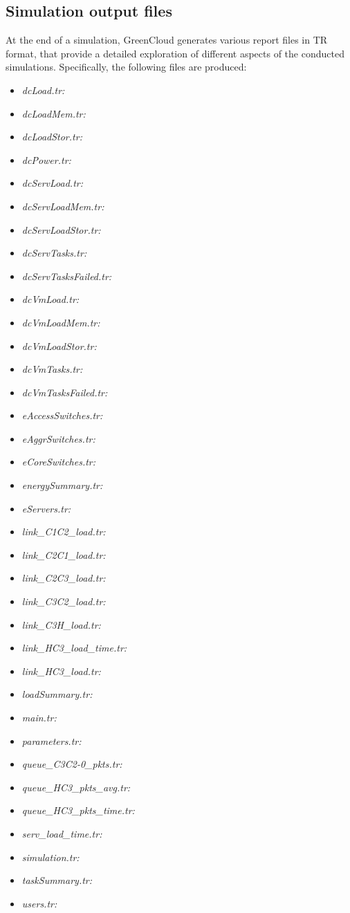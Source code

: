 \subsection{Simulation output files}
At the end of a simulation, GreenCloud generates various report files in TR format, that provide a detailed exploration of different aspects of the conducted simulations. Specifically, the following files are produced:
\begin{itemize}
    \item \emph{dcLoad.tr: }
    \item \emph{dcLoadMem.tr: }
    \item \emph{dcLoadStor.tr: }
    \item \emph{dcPower.tr: } 
    \item \emph{dcServLoad.tr: }
    \item \emph{dcServLoadMem.tr: }
    \item \emph{dcServLoadStor.tr: }
    \item \emph{dcServTasks.tr: }
    \item \emph{dcServTasksFailed.tr: }
    \item \emph{dcVmLoad.tr: }
    \item \emph{dcVmLoadMem.tr: }
    \item \emph{dcVmLoadStor.tr: }
    \item \emph{dcVmTasks.tr: }
    \item \emph{dcVmTasksFailed.tr: }
    \item \emph{eAccessSwitches.tr: }
    \item \emph{eAggrSwitches.tr: }
    \item \emph{eCoreSwitches.tr: }
    \item \emph{energySummary.tr: }
    \item \emph{eServers.tr: }
    \item \emph{link\_C1C2\_load.tr: }
    \item \emph{link\_C2C1\_load.tr: }
    \item \emph{link\_C2C3\_load.tr: }
    \item \emph{link\_C3C2\_load.tr: }
    \item \emph{link\_C3H\_load.tr: }
    \item \emph{link\_HC3\_load\_time.tr: }
    \item \emph{link\_HC3\_load.tr: }
    \item \emph{loadSummary.tr: }
    \item \emph{main.tr: }
    \item \emph{parameters.tr: }
    \item \emph{queue\_C3C2-0\_pkts.tr: }
    \item \emph{queue\_HC3\_pkts\_avg.tr: }
    \item \emph{queue\_HC3\_pkts\_time.tr: }
    \item \emph{serv\_load\_time.tr: }
    \item \emph{simulation.tr: }
    \item \emph{taskSummary.tr: }
    \item \emph{users.tr: }
\end{itemize}
